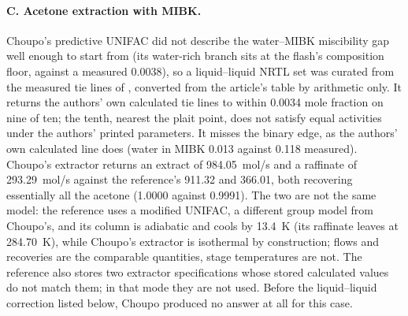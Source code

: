 \documentclass[11pt,a4paper]{article}
\begin{document}
\paragraph{C. Acetone extraction with MIBK.}  Choupo's predictive UNIFAC
did not describe the water--MIBK miscibility gap well enough to start from
(its water-rich branch sits at the flash's composition floor, against a
measured 0.0038), so a liquid--liquid NRTL set was curated from the
measured tie lines of \citet{choi1986}, converted from the article's table
by arithmetic only.  It returns the authors' own calculated tie lines to
within 0.0034 mole fraction on nine of ten; the tenth, nearest the plait
point, does not satisfy equal activities under the authors' printed
parameters.  It misses the binary edge, as the authors' own calculated line
does (water in MIBK 0.013 against 0.118 measured).  Choupo's extractor
returns an extract of 984.05~mol/s and a raffinate of 293.29~mol/s against
the reference's 911.32 and 366.01, both recovering essentially all the
acetone (1.0000 against 0.9991).  The two are not the same model: the
reference uses a modified UNIFAC, a different group model from Choupo's,
and its column is adiabatic and cools by 13.4~K (its raffinate leaves at
284.70~K), while Choupo's extractor is isothermal by construction; flows and
recoveries are the comparable quantities, stage temperatures are not.  The
reference also stores two extractor specifications whose stored calculated
values do not match them; in that mode they are not used.  Before the
liquid--liquid correction listed below, Choupo produced no answer at all
for this case.
\end{document}
